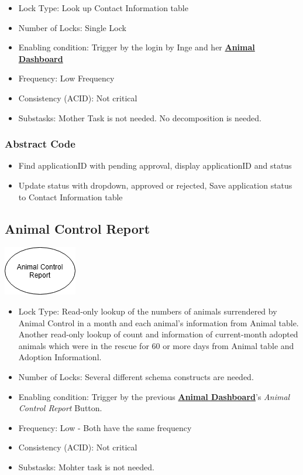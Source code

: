 \documentclass[a4paper]{article}
\begin{document}
\begin{itemize}
	\item Lock Type: Look up Contact Information table
	\item Number of Locks: Single Lock
	\item Enabling condition: Trigger by the login by Inge and her \underline{\textbf{Animal Dashboard}}
	\item Frequency: Low Frequency
	\item Consistency (ACID): Not critical
	\item Substasks:  Mother Task is not needed. No decomposition is needed.
\end{itemize}

\subsubsection*{Abstract Code}

\begin{itemize}
	\item Find applicationID with pending approval, display applicationID and status
	\item Update status with dropdown, approved or rejected, Save application status to Contact Information table


\end{itemize}




\hypertarget{animal_control_report}{\subsection{Animal Control Report}}
\includegraphics[scale = 0.6]{animal_control_report.png}

\begin{itemize}
	\item Lock Type: Read-only lookup of the numbers of animals surrendered by Animal Control in a month and each animal's information from Animal table. Another read-only lookup of count and information of current-month adopted animals which were in the rescue for 60 or more days from Animal table and Adoption Informationl.
	\item Number of Locks: Several different schema constructs are needed.
	\item Enabling condition: Trigger by the previous \underline{\textbf{Animal Dashboard}}'s \textit{Animal Control Report} Button.
	\item Frequency: Low - Both have the same frequency
	\item Consistency (ACID): Not critical
	\item Substasks: Mohter task is not needed.
\end{itemize}
\end{document}
